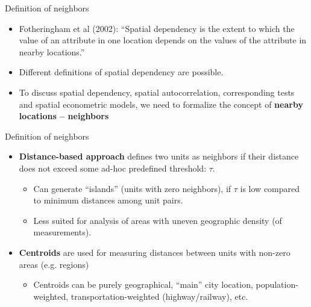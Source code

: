 \documentclass{beamer}
\begin{document}
\begin{frame}{Definition of neighbors}
\begin{itemize}
    \item Fotheringham et al (2002): ``Spatial dependency is the extent to which the value of an attribute in one location depends on the values of the attribute in nearby locations.''
    \medskip
    \item Different definitions of spatial dependency are possible.
    \medskip
    \item To discuss spatial dependency, spatial autocorrelation, corresponding tests and spatial econometric models, we need to formalize the concept of \textbf{nearby locations -- neighbors}
\end{itemize}
\end{frame}
\begin{frame}{Definition of neighbors}
\begin{itemize}
	\item \textbf{Distance-based approach} defines two units as neighbors if their distance does not exceed some ad-hoc predefined threshold: $\tau$. \\
	\medskip
	\begin{itemize}
		\item Can generate ``islands'' (units with zero neighbors), if $\tau$ is low compared to minimum distances among unit pairs.
		\smallskip
		\item Less suited for analysis of areas with uneven geographic density (of measurements). 
	\end{itemize}
	\medskip
	\item \textbf{Centroids} are used for measuring distances between units with non-zero areas (e.g. regions)\\
	\medskip
	\begin{itemize}
		\item Centroids can be purely geographical, ``main'' city location, population-weighted, transportation-weighted (highway/railway), etc.
	\end{itemize}
\end{itemize}
\end{frame}
\end{document}
